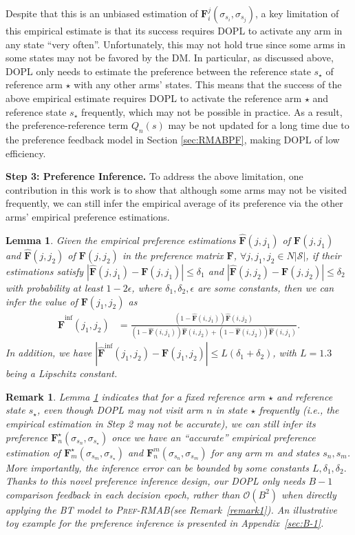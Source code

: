 \documentclass{article} %
\newcommand{\RMABPF}{\textsc{Pref-RMAB}\xspace}
\newcommand{\DOPL}{\textsc{DOPL}\xspace}
\newcommand{\I}{\sigma}
\newcommand{\bF}{\mathbf{F}}
\newcommand{\cS}{\mathcal{S}}
\newtheorem{lemma}{Lemma}
\newtheorem{remark}{Remark}
\begin{document}
{ Despite that this is an unbiased estimation of $\bF_i^j(\I_{s_i}, \I_{s_j})$, a key limitation of this empirical estimate is that its success requires \DOPL to activate any arm in any state ``very often''. Unfortunately, this may not hold true since some arms in some states may not be favored by the DM. In particular, as discussed above, \DOPL only needs to estimate the preference between the reference state $s_\star$ of reference arm $\star$ with any other arms' states.
This means that the success of the above empirical estimate requires \DOPL to activate the reference arm $\star$ and reference state $s_\star$ frequently, which may not be possible in practice.  As a result, the preference-reference term $Q_n(s)$ may be not updated for a long time due to the preference feedback model in Section \ref{sec:RMABPF}, making \DOPL of low efficiency. }


\textbf{Step 3: Preference Inference.}  
To address the above limitation, one contribution in this work is to show that although some arms may not be visited frequently, we can still infer the empirical average of its preference via the other arms' empirical preference estimations. 


\begin{lemma}\label{lemma:infer}
Given the empirical preference estimations $\hat{\bF}(j, j_1)$ of $\bF(j, j_1)$ and $\hat{\bF}(j, j_2)$ of $\bF(j, j_2)$ in the preference matrix $\bF$, $\forall j, j_1, j_2\in N|\cS|$, if their estimations satisfy $|\hat{\bF}(j, j_1)-\bF(j, j_1)|\leq \delta_1$ and $|\hat{\bF}(j, j_2)-\bF(j, j_2)|\leq \delta_2$ with probability at least $1-2\epsilon$, where $\delta_1, \delta_2, \epsilon$ are some constants,  then we can infer the value of $\bF(j_1, j_2)$ as
\begin{align}\label{eq:inference}
    \hat{\bF}^{\text{inf}}(j_1, j_2)
    &=\frac{(1-\hat{\bF}(i,j_1))\hat{\bF}(i,j_2)}{(1-\hat{\bF}(i,j_1))\hat{\bF}(i,j_2)+(1-\hat{\bF}(i,j_2))\hat{\bF}(i,j_1)}. 
\end{align}
In addition, we have 
    $|\hat{\bF}^{\text{inf}}(j_1,j_2)-\bF(j_1, j_2)|\leq L(\delta_1+\delta_2)$, with $L=1.3$ being a Lipschitz constant.
\end{lemma}
\begin{remark}
    Lemma \ref{lemma:infer} indicates that for a fixed reference arm $\star$ and reference state $s_\star$, even though \DOPL may not visit arm $n$ in state $\star$ frequently (i.e., the empirical estimation in Step 2 may not be accurate), we can still infer its preference $\bF_n^\star(\I_{s_n}, \I_{s_\star})$ once we have an ``accurate'' empirical preference estimation of $\bF_m^\star(\I_{s_m}, \I_{s_\star})$ and $\bF_n^m(\I_{s_n}, \I_{s_m})$ for any arm $m$ and states $s_n, s_m$. More importantly, the inference error can be bounded by some constants $L, \delta_1, \delta_2.$ Thanks to this novel preference inference design, our \DOPL only needs $B-1$ comparison feedback in each decision epoch, rather than $\mathcal{O}(B^2)$ when directly applying the BT model to \RMABPF (see Remark~\ref{remark1}). An illustrative toy example for the preference inference is presented in Appendix~\ref{sec:B-1}. 
\end{remark}
\end{document}
